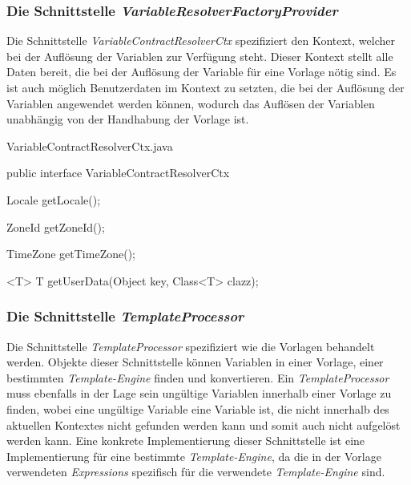 \subsubsection{Die Schnittstelle \emph{VariableResolverFactoryProvider}}
\label{sec:variableResolverFactoryProvider}
Die Schnittstelle \emph{VariableContractResolverCtx} spezifiziert den Kontext, welcher bei der Auflösung der Variablen zur Verfügung steht. Dieser Kontext stellt alle Daten bereit, die bei der Auflösung der Variable für eine Vorlage nötig sind. Es ist auch möglich Benutzerdaten im Kontext zu setzten, die bei der Auflösung der Variablen angewendet werden können, wodurch das Auflösen der Variablen unabhängig von der Handhabung der Vorlage ist.

\begin{program}[h]
\caption{VariableContractResolverCtx.java}
\label{prog:variableContractResolverCtx}
\begin{JavaCode}
public interface VariableContractResolverCtx {

    Locale getLocale();

    ZoneId getZoneId();

    TimeZone getTimeZone();

    <T> T getUserData(Object key,
                      Class<T> clazz);
}
\end{JavaCode}
\end{program}

\subsubsection{Die Schnittstelle \emph{TemplateProcessor}}
\label{sec:templateProcessor}
Die Schnittstelle \emph{TemplateProcessor} spezifiziert wie die Vorlagen behandelt werden. Objekte dieser Schnittstelle können Variablen in einer Vorlage, einer bestimmten \emph{Template-Engine} finden und konvertieren. Ein \emph{TemplateProcessor} muss ebenfalls in der Lage sein ungültige Variablen innerhalb einer Vorlage zu finden, wobei eine ungültige Variable eine Variable ist, die nicht innerhalb des aktuellen Kontextes nicht gefunden werden kann und somit auch nicht aufgelöst werden kann.
\newline
\newline
Eine konkrete Implementierung dieser Schnittstelle ist eine Implementierung für eine bestimmte \emph{Template-Engine}, da die in der Vorlage verwendeten \emph{Expressions} spezifisch für die verwendete \emph{Template-Engine} sind.


